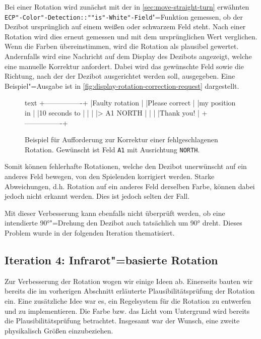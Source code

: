 Bei einer Rotation wird zunächst mit der in \autoref{sec:move-straight-turn} erwähnten \texttt{ECP"-Color"-Detection::""is"-White"-Field}"=Funktion gemessen, ob der Dezibot ursprünglich auf einem weißen oder schwarzem Feld steht. Nach einer Rotation wird dies erneut gemessen und mit dem ursprünglichen Wert verglichen. Wenn die Farben übereinstimmen, wird die Rotation als plausibel gewertet. Andernfalls wird eine Nachricht auf dem Display des Dezibots angezeigt, welche eine manuelle Korrektur anfordert. Dabei wird das gewünschte Feld sowie die Richtung, nach der der Dezibot ausgerichtet werden soll, ausgegeben. Eine Beispiel"=Ausgabe ist in \autoref{fig:display-rotation-correction-request} dargestellt.

\begin{figure}[h]
\centering
\begin{cminted}{text}
+----------------+
|Faulty rotation |
|Please correct  |
|my position in  |
|10 seconds to   |
|                |
|> A1 NORTH      |
|                |
|Thank you!      |
+----------------+
\end{cminted}
\caption{Beispiel für Aufforderung zur Korrektur einer fehlgeschlagenen Rotation. Gewünscht ist Feld \texttt{A1} mit Ausrichtung \texttt{NORTH}.}
\label{fig:display-rotation-correction-request}
\end{figure}

Somit können fehlerhafte Rotationen, welche den Dezibot unerwünscht auf ein anderes Feld bewegen, von den Spielenden korrigiert werden. Starke Abweichungen, d.h. Rotation auf ein anderes Feld derselben Farbe, können dabei jedoch nicht erkannt werden. Dies ist jedoch selten der Fall.

Mit dieser Verbesserung kann ebenfalls nicht überprüft werden, ob eine intendierte 90°"=Drehung den Dezibot auch tatsächlich um 90° dreht. Dieses Problem wurde in der folgenden Iteration thematisiert.


\subsection{Iteration 4: Infrarot"=basierte Rotation}
\label{sec:movement-ir}

Zur Verbesserung der Rotation wogen wir einige Ideen ab. Einerseits bauten wir bereits die im vorherigen Abschnitt erläuterte Plausibilitätsprüfung der Rotation ein. Eine zusätzliche Idee war es, ein Regelsystem für die Rotation zu entwerfen und zu implementieren. Die Farbe bzw. das Licht vom Untergrund wird bereits die Plausibilitätsprüfung betrachtet. Insgesamt war der Wunsch, eine zweite physikalisch Größen einzubeziehen.

